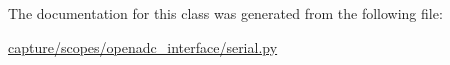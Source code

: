 The documentation for this class was generated from the following file\+:\begin{DoxyCompactItemize}
\item 
\hyperlink{capture_2scopes_2openadc__interface_2serial_8py}{capture/scopes/openadc\+\_\+interface/serial.\+py}\end{DoxyCompactItemize}

